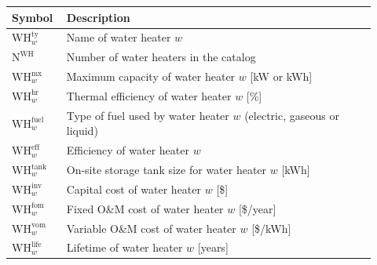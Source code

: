 \documentclass[11pt]{article}
\begin{document}
\begin{center}
\centering
\begin{tabular}{p{0.12\linewidth}p{0.8\linewidth}}
\hline
\textbf{Symbol} & \textbf{Description} \\
\hline
\(\text{WH}^\text{ty}_w\) & Name of water heater \(w\) \\
\(\text{N}^\text{WH}\) & Number of water heaters in the catalog \\
\(\text{WH}^\text{mx}_w\) & Maximum capacity of water heater \(w\) [kW or kWh] \\
\(\text{WH}^\text{hr}_w\) & Thermal efficiency of water heater \(w\) [\%] \\
\(\text{WH}^\text{fuel}_w\) & Type of fuel used by water heater \(w\) (electric, gaseous or liquid) \\
\(\text{WH}^\text{eff}_w\) & Efficiency of water heater \(w\) \\
\(\text{WH}^\text{tank}_w\) & On-site storage tank size for water heater \(w\) [kWh] \\
\(\text{WH}^\text{inv}_w\) & Capital cost of water heater \(w\) [\$] \\
\(\text{WH}^\text{fom}_w\) & Fixed O\&M cost of water heater \(w\) [\$/year] \\
\(\text{WH}^\text{vom}_w\) & Variable O\&M cost of water heater \(w\) [\$/kWh] \\
\(\text{WH}^\text{life}_w\) & Lifetime of water heater \(w\) [years] \\
\hline
\end{tabular}
\captionsetup{type=table}
\label{tab:wh_parameters}
\end{center}
\end{document}
